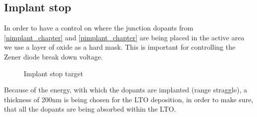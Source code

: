 \subsection{Implant stop}\label{implant_stop_chapter}

In order to have a control on where the junction dopants from \autoref{nimplant_chapter} and \autoref{pimplant_chapter} are being placed in the active area we use a layer of oxide as a hard mask.
This is important for controlling the Zener diode break down voltage.

\begin{figure}[H]
	\centering
	\begin{tikzpicture}[node distance = 3cm, auto, thick,scale=\CrossAndTopSectionBig, every node/.style={transform shape}]
		
	\end{tikzpicture}
	\caption{Implant stop target}
\end{figure}

Because of the energy, with which the dopants are implanted (range straggle), a thickness of 200nm is being chosen for the LTO deposition, in order to make sure, that all the dopants are being absorbed
within the LTO.
